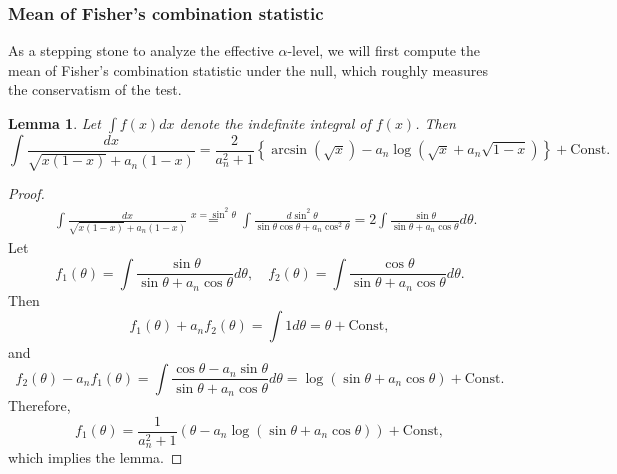 \documentclass[11pt]{article}
\newtheorem{lemma}{Lemma}
\newcommand{\lb}{\left(}
\newcommand{\rb}{\right)}
\begin{document}
\subsubsection{Mean of Fisher's combination statistic}
As a stepping stone to analyze the effective $\alpha$-level, we will first compute the mean of Fisher's combination statistic under the null, which roughly measures the conservatism of the test.
\begin{lemma}\label{lem:integral}
  Let $\int f(x)dx$ denote the indefinite integral of $f(x)$. Then
  \[\int \frac{dx}{\sqrt{x(1-x)} + a_n(1 - x)} = \frac{2}{a_n^2 + 1}\left\{ \arcsin(\sqrt{x}) - a_n \log\lb \sqrt{x} + a_n\sqrt{1 - x}\rb\right\} + \mathrm{Const}.\]
\end{lemma}
\begin{proof}
  \begin{align*}
    &\int \frac{dx}{\sqrt{x(1-x)} + a_n(1 - x)} \stackrel{x = \sin^2\theta}{=}\int \frac{d\sin^2\theta}{\sin\theta \cos\theta + a_n\cos^2\theta} = 2\int \frac{\sin\theta}{\sin\theta + a_n \cos\theta}d\theta.
  \end{align*}
  Let
  \[f_1(\theta) = \int \frac{\sin\theta}{\sin\theta + a_n \cos\theta}d\theta, \quad f_2(\theta) = \int \frac{\cos\theta}{\sin\theta + a_n \cos\theta}d\theta.\]
  Then
  \[f_1(\theta) + a_n f_2(\theta) = \int 1d\theta = \theta + \mathrm{Const},\]
  and
  \[f_2(\theta) - a_n f_1(\theta) = \int \frac{\cos\theta - a_n \sin\theta}{\sin\theta + a_n \cos\theta}d\theta = \log(\sin\theta + a_n \cos\theta) + \mathrm{Const}.\]
  Therefore,
  \[f_1(\theta) = \frac{1}{a_n^2 + 1}\lb \theta - a_n\log(\sin\theta + a_n \cos\theta)\rb + \mathrm{Const},\]
  which implies the lemma.
\end{proof}
\end{document}
